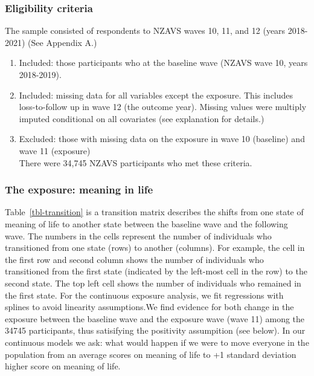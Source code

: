 \documentclass[
  singlecolumn,
  9pt]{scrartcl}
\providecommand{\tightlist}{%
  \setlength{\itemsep}{0pt}\setlength{\parskip}{0pt}}\usepackage{longtable,booktabs,array}
\begin{document}
\subsubsection{Eligibility criteria}\label{eligibility-criteria}

The sample consisted of respondents to NZAVS waves 10, 11, and 12 (years
2018-2021) (See Appendix A.)

\begin{enumerate}
\def\labelenumi{\arabic{enumi}.}
\tightlist
\item
  Included: those participants who at the baseline wave (NZAVS wave 10,
  years 2018-2019).
\item
  Included: missing data for all variables except the exposure. This
  includes loss-to-follow up in wave 12 (the outcome year). Missing
  values were multiply imputed conditional on all covariates (see
  explanation for details.)
\item
  Excluded: those with missing data on the exposure in wave 10
  (baseline) and wave 11 (exposure)\\
  There were 34,745 NZAVS participants who met these criteria.
\end{enumerate}

\subsubsection{The exposure: meaning in
life}\label{the-exposure-meaning-in-life}

Table~\ref{tbl-transition} is a transition matrix describes the shifts
from one state of meaning of life to another state between the baseline
wave and the following wave. The numbers in the cells represent the
number of individuals who transitioned from one state (rows) to another
(columns). For example, the cell in the first row and second column
shows the number of individuals who transitioned from the first state
(indicated by the left-most cell in the row) to the second state. The
top left cell shows the number of individuals who remained in the first
state. For the continuous exposure analysis, we fit regressions with
splines to avoid linearity assumptions.We find evidence for both change
in the exposure between the baseline wave and the exposure wave (wave
11) among the 34745 participants, thus satisifying the positivity
assumpition (see below). In our continuous models we ask: what would
happen if we were to move everyone in the population from an average
scores on meaning of life to +1 standard deviation higher score on
meaning of life.
\end{document}
